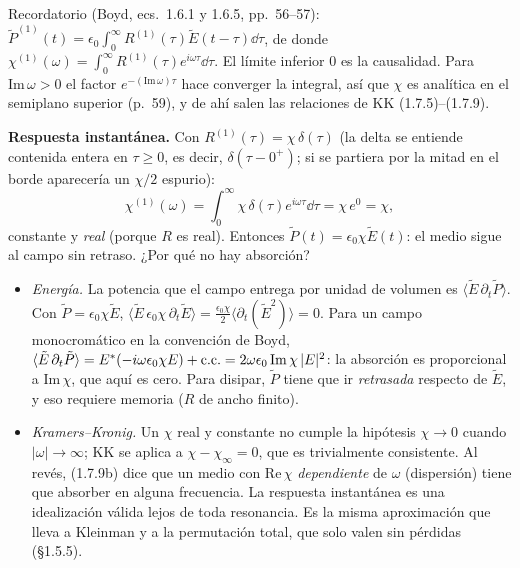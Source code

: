 \label{sol:37}

Recordatorio (Boyd, ecs.~1.6.1 y 1.6.5, pp.~56–57): $\tilde P^{(1)}(t)=\epsilon_0\int_0^\infty R^{(1)}(\tau)\tilde E(t-\tau)\dd\tau$, de donde
$\chi^{(1)}(\omega)=\int_0^\infty R^{(1)}(\tau)e^{i\omega\tau}\dd\tau$. El límite inferior 0 es la causalidad. Para $\mathrm{Im}\,\omega>0$ el factor
$e^{-(\mathrm{Im}\,\omega)\tau}$ hace converger la integral, así que $\chi$ es analítica en el semiplano superior (p.~59), y de ahí salen las relaciones de KK (1.7.5)–(1.7.9).

 \textbf{Respuesta instantánea.} Con $R^{(1)}(\tau)=\chi\,\delta(\tau)$ (la delta se entiende contenida entera en $\tau\ge0$, es decir, $\delta(\tau-0^+)$;
si se partiera por la mitad en el borde aparecería un $\chi/2$ espurio):
\[
\chi^{(1)}(\omega)=\int_0^\infty\chi\,\delta(\tau)e^{i\omega\tau}\dd\tau=\chi\,e^{0}=\chi,
\]
constante y \emph{real} (porque $R$ es real). Entonces $\tilde P(t)=\epsilon_0\chi\tilde E(t)$: el medio sigue al campo sin retraso. ¿Por qué no hay absorción?
\begin{itemize}
\item \emph{Energía.} La potencia que el campo entrega por unidad de volumen es $\langle\tilde E\,\partial_t\tilde P\rangle$. Con $\tilde P=\epsilon_0\chi\tilde E$,
$\langle\tilde E\,\epsilon_0\chi\,\partial_t\tilde E\rangle=\frac{\epsilon_0\chi}{2}\langle\partial_t(\tilde E^2)\rangle=0$. Para un campo monocromático en la convención de Boyd,
$\langle\tilde E\,\partial_t\tilde P\rangle=E^*(-i\omega\epsilon_0\chi E)+\text{c.c.}=2\omega\epsilon_0\,\mathrm{Im}\,\chi\,|E|^2$: la absorción es proporcional a $\mathrm{Im}\,\chi$, que aquí es cero.
Para disipar, $\tilde P$ tiene que ir \emph{retrasada} respecto de $\tilde E$, y eso requiere memoria ($R$ de ancho finito).
\item \emph{Kramers--Kronig.} Un $\chi$ real y constante no cumple la hipótesis $\chi\to0$ cuando $|\omega|\to\infty$; KK se aplica a $\chi-\chi_\infty=0$, que es
trivialmente consistente. Al revés, (1.7.9b) dice que un medio con $\mathrm{Re}\,\chi$ \emph{dependiente} de $\omega$ (dispersión) tiene que absorber en alguna frecuencia.
La respuesta instantánea es una idealización válida lejos de toda resonancia. Es la misma aproximación que lleva a Kleinman y a la permutación total, que solo valen sin pérdidas (§1.5.5).
\end{itemize}

